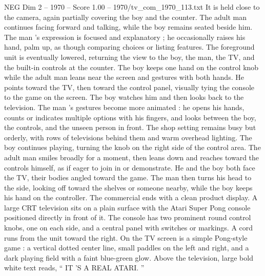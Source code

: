 \begin{textsample}{NEG Dim 2 – 1970 – Score 1.00 – 1970/tv\_com\_1970\_113.txt}
It is held close to the camera, again partially covering the boy and the counter.
The adult man continues facing forward and talking, while the boy remains seated beside him.
The man ’s expression is focused and explanatory ; he occasionally raises his hand, palm up, as though comparing choices or listing features.
The foreground unit is eventually lowered, returning the view to the boy, the man, the TV, and the built-in controls at the counter.
The boy keeps one hand on the control knob while the adult man leans near the screen and gestures with both hands.
He points toward the TV, then toward the control panel, visually tying the console to the game on the screen.
The boy watches him and then looks back to the television.
The man ’s gestures become more animated : he opens his hands, counts or indicates multiple options with his fingers, and looks between the boy, the controls, and the unseen person in front.
The shop setting remains busy but orderly, with rows of televisions behind them and warm overhead lighting.
The boy continues playing, turning the knob on the right side of the control area.
The adult man smiles broadly for a moment, then leans down and reaches toward the controls himself, as if eager to join in or demonstrate.
He and the boy both face the TV, their bodies angled toward the game.
The man then turns his head to the side, looking off toward the shelves or someone nearby, while the boy keeps his hand on the controller.
The commercial ends with a clean product display.
A large CRT television sits on a plain surface with the Atari Super Pong console positioned directly in front of it.
The console has two prominent round control knobs, one on each side, and a central panel with switches or markings.
A cord runs from the unit toward the right.
On the TV screen is a simple Pong-style game : a vertical dotted center line, small paddles on the left and right, and a dark playing field with a faint blue-green glow.
Above the television, large bold white text reads, “ IT ’S A REAL ATARI. ”

\end{textsample}
